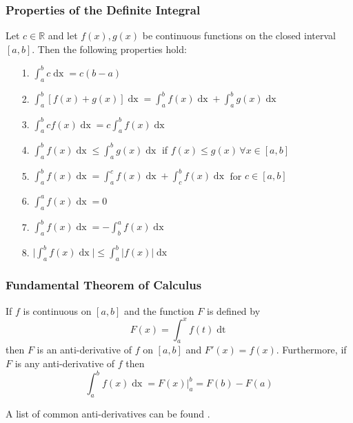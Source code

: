 \documentclass{beamer}
\begin{document}
\begin{frame}
\frametitle{\textbf{Properties of the Definite Integral}}
Let $c \in \mathbb{R}$ and let $f(x),g(x)$ be continuous functions on the closed interval $[a,b]$. Then the following properties hold:
\begin{itemize}
	\item[1.] $\int_{a}^{b} c \mathop{dx} = c(b-a)$
	\item[2.] $\int_{a}^{b} [f(x) + g(x)] \mathop{dx} = \int_{a}^{b} f(x) \mathop{dx} + \int_{a}^{b} g(x) \mathop{dx}$
	\item[3.] $\int_{a}^{b}c f(x) \mathop{dx} = c\int_{a}^{b} f(x) \mathop{dx} $
	\item[4.] $\int_{a}^{b} f(x) \mathop{dx} \leq \int_{a}^{b} g(x) \mathop{dx} $ if $f(x) \leq g(x) \, \forall x \in [a,b]$
	\item[5.] $\int_{a}^{b} f(x) \mathop{dx} = \int_{a}^{c} f(x) \mathop{dx} + \int_{c}^{b} f(x) \mathop{dx}$ for $c \in [a,b]$
	\item[6.] $\int_{a}^{a} f(x) \mathop{dx} =0$
	\item[7.] $\int_{a}^{b} f(x) \mathop{dx} = - \int_{b}^{a} f(x) \mathop{dx} $
	\item[8.] $\Big| \int_{a}^{b} f(x) \mathop{dx} \Big| \leq \int_{a}^{b} |f(x)| \mathop{dx} $
\end{itemize}
\end{frame}




\begin{frame}
\frametitle{\textbf{Fundamental Theorem of Calculus}}

\begin{theorem}
	If $f$ is continuous on $[a,b]$ and the function $F$ is defined by
	$$ F(x) = \int_{a}^{x} f(t) \mathop{dt}$$
	then $F$ is an anti-derivative of $f$ on $[a,b]$ and $F'(x) = f(x)$. Furthermore, if $F$ is any anti-derivative of $f$ then
	$$ \int_{a}^{b} f(x) \mathop{dx} = F(x) \Big|_a^b = F(b) - F(a)$$
\end{theorem}

\vspace{6pt}

A list of common anti-derivatives can be found \href{https://www.wyzant.com/resources/lessons/math/calculus/integration/antiderivatives}{}.
\end{frame}
\end{document}
